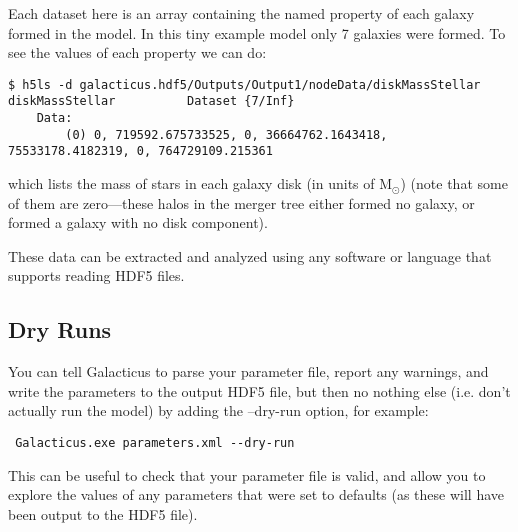 Each dataset here is an array containing the named property of each galaxy formed in the model. In this tiny example model only 7 galaxies were formed. To see the values of each property we can do:
\begin{verbatim}
$ h5ls -d galacticus.hdf5/Outputs/Output1/nodeData/diskMassStellar
diskMassStellar          Dataset {7/Inf}
    Data:
        (0) 0, 719592.675733525, 0, 36664762.1643418, 75533178.4182319, 0, 764729109.215361
\end{verbatim}
which lists the mass of stars in each galaxy disk (in units of $\mathrm{M}_\odot$) (note that some of them are zero---these halos in the merger tree either formed no galaxy, or formed a galaxy with no disk component).

These data can be extracted and analyzed using any software or language that supports reading HDF5 files.

\subsection{Dry Runs}

You can tell Galacticus to parse your parameter file, report any warnings, and write the parameters to the output HDF5 file, but then no nothing else (i.e. don't actually run the model) by adding the {\normalfont \ttfamily --dry-run} option, for example:
\begin{verbatim}
 Galacticus.exe parameters.xml --dry-run
\end{verbatim}
This can be useful to check that your parameter file is valid, and allow you to explore the values of any parameters that were set to defaults (as these will have been output to the HDF5 file).
